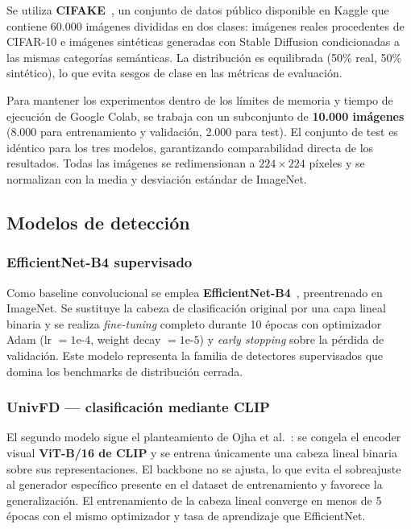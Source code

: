 \documentclass[12pt,a4paper,twoside]{article}
\begin{document}
Se utiliza \textbf{CIFAKE}~\cite{cifake}, un conjunto de datos público disponible en
Kaggle que contiene 60.000 imágenes divididas en dos clases: imágenes reales
procedentes de CIFAR-10 e imágenes sintéticas generadas con Stable Diffusion
condicionadas a las mismas categorías semánticas. La distribución es equilibrada
(50\% real, 50\% sintético), lo que evita sesgos de clase en las métricas de
evaluación.

Para mantener los experimentos dentro de los límites de memoria y tiempo de
ejecución de Google Colab, se trabaja con un subconjunto de \textbf{10.000 imágenes}
(8.000 para entrenamiento y validación, 2.000 para test). El conjunto de test es
idéntico para los tres modelos, garantizando comparabilidad directa de los
resultados. Todas las imágenes se redimensionan a $224 \times 224$ píxeles y se
normalizan con la media y desviación estándar de ImageNet.

\subsection{Modelos de detección}

\subsubsection{EfficientNet-B4 supervisado}

Como baseline convolucional se emplea \textbf{EfficientNet-B4}~\cite{tan2019efficientnet},
preentrenado en ImageNet. Se sustituye la cabeza de clasificación original por una
capa lineal binaria y se realiza \textit{fine-tuning} completo durante 10 épocas con
optimizador Adam (lr $= 1\text{e-}4$, weight decay $= 1\text{e-}5$) y
\textit{early stopping} sobre la pérdida de validación. Este modelo representa la
familia de detectores supervisados que domina los benchmarks de distribución cerrada.

\subsubsection{UnivFD — clasificación mediante CLIP}

El segundo modelo sigue el planteamiento de Ojha et al.~\cite{ojha2023univfd}: se
congela el encoder visual \textbf{ViT-B/16 de CLIP} y se entrena únicamente una
cabeza lineal binaria sobre sus representaciones. El backbone no se ajusta, lo que
evita el sobreajuste al generador específico presente en el dataset de entrenamiento
y favorece la generalización. El entrenamiento de la cabeza lineal converge en menos
de 5 épocas con el mismo optimizador y tasa de aprendizaje que EfficientNet.
\end{document}
